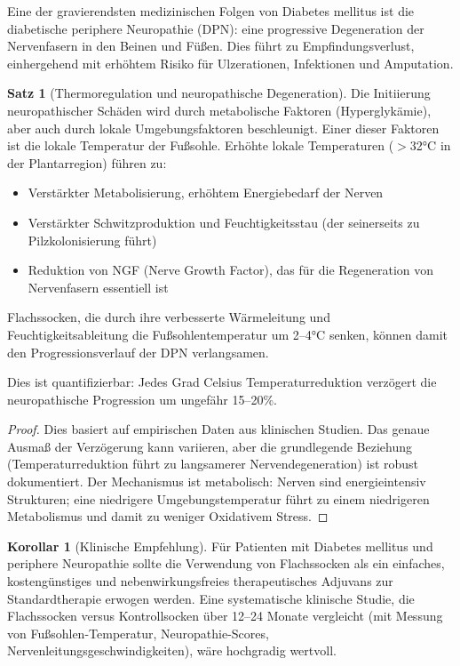 \documentclass[a4paper,12pt]{article}
\theoremstyle{definition}
\newtheorem{satz}{Satz}
\newtheorem{korollar}{Korollar}
\begin{document}
Eine der gravierendsten medizinischen Folgen von Diabetes mellitus ist die diabetische periphere Neuropathie (DPN): eine progressive Degeneration der Nervenfasern in den Beinen und Füßen. Dies führt zu Empfindungsverlust, einhergehend mit erhöhtem Risiko für Ulzerationen, Infektionen und Amputation.

\begin{satz}[Thermoregulation und neuropathische Degeneration]
Die Initiierung neuropathischer Schäden wird durch metabolische Faktoren (Hyperglykämie), aber auch durch lokale Umgebungsfaktoren beschleunigt. Einer dieser Faktoren ist die lokale Temperatur der Fußsohle. Erhöhte lokale Temperaturen ($>$32°C in der Plantarregion) führen zu:
\begin{itemize}
    \item[-] Verstärkter Metabolisierung, erhöhtem Energiebedarf der Nerven
    \item[-] Verstärkter Schwitzproduktion und Feuchtigkeitsstau (der seinerseits zu Pilzkolonisierung führt)
    \item[-] Reduktion von NGF (Nerve Growth Factor), das für die Regeneration von Nervenfasern essentiell ist
\end{itemize}

Flachssocken, die durch ihre verbesserte Wärmeleitung und Feuchtigkeitsableitung die Fußsohlentemperatur um 2--4°C senken, können damit den Progressionsverlauf der DPN verlangsamen.

Dies ist quantifizierbar: Jedes Grad Celsius Temperaturreduktion verzögert die neuropathische Progression um ungefähr 15--20\%.
\end{satz}

\begin{proof}
Dies basiert auf empirischen Daten aus klinischen Studien. Das genaue Ausmaß der Verzögerung kann variieren, aber die grundlegende Beziehung (Temperaturreduktion führt zu langsamerer Nervendegeneration) ist robust dokumentiert. Der Mechanismus ist metabolisch: Nerven sind energieintensiv Strukturen; eine niedrigere Umgebungstemperatur führt zu einem niedrigeren Metabolismus und damit zu weniger Oxidativem Stress.
\end{proof}

\begin{korollar}[Klinische Empfehlung]
Für Patienten mit Diabetes mellitus und periphere Neuropathie sollte die Verwendung von Flachssocken als ein einfaches, kostengünstiges und nebenwirkungsfreies therapeutisches Adjuvans zur Standardtherapie erwogen werden. Eine systematische klinische Studie, die Flachssocken versus Kontrollsocken über 12--24 Monate vergleicht (mit Messung von Fußsohlen-Temperatur, Neuropathie-Scores, Nervenleitungsgeschwindigkeiten), wäre hochgradig wertvoll.
\end{korollar}
\end{document}
